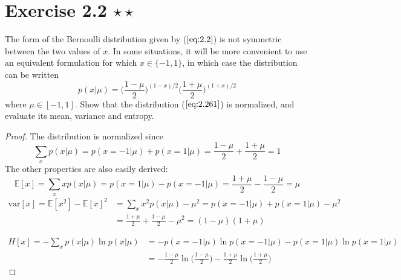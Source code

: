 \section*{Exercise 2.2 $\star \star$}
The form of the Bernoulli distribution given by ($\ref{eq:2.2}$)
is not symmetric between the two values of $x$. In some situations,
it will be more convenient to use an equivalent formulation for which
$x \in \{-1 , 1\}$, in which case the distribution can be written
\begin{equation}\label{eq:2.261}\tag{2.261}
    p(x | \mu) = \bigg(\frac{1 - \mu}{2}\bigg)^{(1 - x)/2} \bigg(\frac{1 + \mu}{2}\bigg)^{(1 + x)/2}
\end{equation}
where $\mu \in [-1, 1].$ Show that the distribution ($\ref{eq:2.261}$) is normalized,
and evaluate its mean, variance and entropy.

\vspace{1em}

\begin{proof}
    The distribution is normalized since
    \[
        \sum_{x} p(x | \mu) = p(x = -1 | \mu) + p(x = 1 | \mu) 
        = \frac{1 - \mu}{2} + \frac{1 + \mu}{2} = 1
    \] 
    The other properties are also easily derived:
    \[
        \mathbb{E}[x] = \sum_{x} xp(x | \mu) 
        = p(x = 1 | \mu) - p(x = -1 | \mu)
        = \frac{1 + \mu}{2} - \frac{1 - \mu}{2}
        = \mu
    \] 
    \begin{align*}
        \text{var}[x] = \mathbb{E}[x^2] - \mathbb{E}[x]^2
        &= \sum_{x} x^2 p(x | \mu) - \mu^2
        = p(x = -1 | \mu) + p(x = 1 | \mu) - \mu^2 \\
        &= \frac{1+\mu}{2} + \frac{1-\mu}{2} - \mu^2
        = (1 - \mu)(1 + \mu)
    \end{align*}

    \begin{align*}
        H[x] = -\sum_{x} p(x | \mu) \ln p(x | \mu)
        &= -p(x = -1 | \mu) \ln p(x = -1 | \mu) - p(x = 1 | \mu) \ln p(x = 1 | \mu) \\
        &= -\frac{1 - \mu}{2} \ln\bigg(\frac{1 - \mu}{2}\bigg)
        - \frac{1 + \mu}{2} \ln\bigg(\frac{1 + \mu}{2}\bigg)
    \end{align*}
\end{proof}

